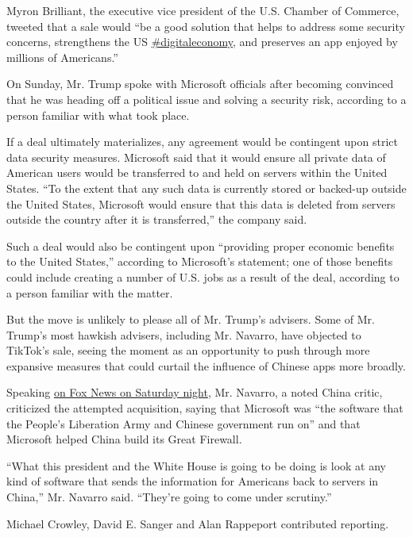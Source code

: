 Myron Brilliant, the executive vice president of the U.S. Chamber of
Commerce, tweeted that a sale would ``be a good solution that helps to
address some security concerns, strengthens the US
\href{https://twitter.com/hashtag/digitaleconomy?src=hashtag_click}{\#digitaleconomy},
and preserves an app enjoyed by millions of Americans.''

On Sunday, Mr. Trump spoke with Microsoft officials after becoming
convinced that he was heading off a political issue and solving a
security risk, according to a person familiar with what took place.

If a deal ultimately materializes, any agreement would be contingent
upon strict data security measures. Microsoft said that it would ensure
all private data of American users would be transferred to and held on
servers within the United States. ``To the extent that any such data is
currently stored or backed-up outside the United States, Microsoft would
ensure that this data is deleted from servers outside the country after
it is transferred,'' the company said.

Such a deal would also be contingent upon ``providing proper economic
benefits to the United States,'' according to Microsoft's statement; one
of those benefits could include creating a number of U.S. jobs as a
result of the deal, according to a person familiar with the matter.

But the move is unlikely to please all of Mr. Trump's advisers. Some of
Mr. Trump's most hawkish advisers, including Mr. Navarro, have objected
to TikTok's sale, seeing the moment as an opportunity to push through
more expansive measures that could curtail the influence of Chinese apps
more broadly.

Speaking
\href{https://www.foxnews.com/media/peter-navarro-on-tiktok-china-use-these-social-media-apps-to-track-you-and-surveil-you-and-monitor-your-movements}{on
Fox News on Saturday night}, Mr. Navarro, a noted China critic,
criticized the attempted acquisition, saying that Microsoft was ``the
software that the People's Liberation Army and Chinese government run
on'' and that Microsoft helped China build its Great Firewall.

``What this president and the White House is going to be doing is look
at any kind of software that sends the information for Americans back to
servers in China,'' Mr. Navarro said. ``They're going to come under
scrutiny.''

Michael Crowley, David E. Sanger and Alan Rappeport contributed
reporting.

